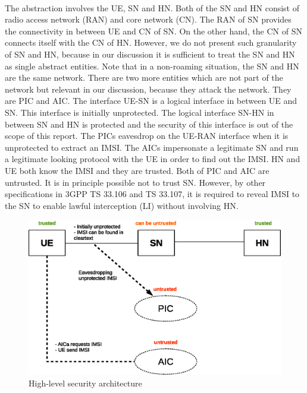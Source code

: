 \documentclass[lnicst,sechang,a4paper]{svmultln}
\begin{document}
\paragraph{}
The abstraction involves the UE, SN and HN. Both of the SN and HN consist of radio access network (RAN) and core network (CN). The RAN of SN provides the connectivity in between UE and CN of SN. On the other hand, the CN of SN connects itself with the CN of HN. However, we do not present such granularity of SN and HN, because in our discussion it is sufficient to treat the SN and HN as single abstract entities. Note that in a non-roaming situation, the SN and HN are the same network. There are two more entities which are not part of the network but relevant in our discussion, because they attack the network. They are PIC and AIC. The interface UE-SN is a logical interface in between UE and SN. This interface is initially unprotected. The logical interface SN-HN in between SN and HN is protected and the security of this interface is out of the scope of this report. The PICs eavesdrop on the UE-RAN interface when it is unprotected to extract an IMSI. The AICs impersonate a legitimate SN and run a legitimate looking protocol with the UE in order to find out the IMSI. HN and UE both know the IMSI and they are trusted. Both of PIC and AIC are untrusted. It is in principle possible not to trust SN. However, by other specifications in 3GPP TS 33.106 and TS 33.107, it is required to reveal IMSI to the SN to enable lawful interception (LI) without involving HN.

\begin{figure}
\begin{center}
  \includegraphics[width=.98\textwidth]{security_architecture_abstraction.eps}
\caption{High-level security architecture}
\label{fig:security_architecture_abstraction}       %
\end{center}
\end{figure}
\end{document}
